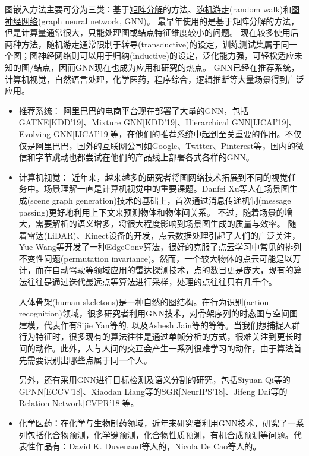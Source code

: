\documentclass[reportComp]{thesis}
\begin{document}
图嵌入方法主要可分为三类：基于\underline{矩阵分解}的方法、\underline{随机游走}(random walk)和\underline{图神经网络}(graph neural network, GNN)。
最早年使用的是基于矩阵分解的方法，但是计算量通常很大，只能处理图或结点特征维度较小的问题。
现在较多使用后两种方法，随机游走通常限制于转导(transductive)的设定，训练测试集属于同一个图；图神经网络则可以用于归纳(inductive)的设定，泛化能力强，可轻松适应未知的图/结点，因而GNN现在也成为应用和研究的热点。
GNN已经在推荐系统，计算机视觉，自然语言处理，化学医药，程序综合，逻辑推断等大量场景得到广泛应用。
\begin{itemize}
    \item 推荐系统：
    阿里巴巴的电商平台现在部署了大量的GNN\cite{zhu:aligraph_vldb_2019}，包括GATNE[KDD'19]、Mixture GNN[KDD'19]、Hierarchical GNN[IJCAI'19]、Evolving GNN[IJCAI'19]等，在他们的推荐系统中起到至关重要的作用。不仅仅是阿里巴巴，国外的互联网公司如Google、Twitter、Pinterest等，国内的微信和字节跳动也都尝试在他们的产品线上部署各式各样的GNN。
    
    \item 计算机视觉：
    近年来，越来越多的研究者将图网络技术拓展到不同的视觉任务中。场景理解一直是计算机视觉中的重要课题。Danfei Xu等人在场景图生成(scene graph generation)技术的基础上，首次通过消息传递机制(message passing)更好地利用上下文来预测物体和物体间关系\cite{Xu:sgg_cvpr_2017}。
    不过，随着场景的增大，需要解析的语义增多，将很大程度影响到场景图生成的质量与效率。
    随着雷达(LiDAR)、Kinect设备的开发，点云数据处理引起了人们的广泛关注，Yue Wang等开发了一种EdgeConv算法\cite{wang:dgcnn_tog_2018}，很好的克服了点云学习中常见的排列不变性问题(permutation invariance)。然而，一个较大物体的点云可能是以万计，而在自动驾驶等领域应用的雷达探测技术，点的数目更是庞大，现有的算法往往是通过迭代最远点等算法进行采样，处理的点往往只有几千个。
    
    人体骨架(human skeletons)是一种自然的图结构。在行为识别(action recognition)领域，很多研究者利用GNN技术，对骨架序列的时态图与空间图建模，代表作有Sijie Yan等的\cite{yan:action_aaai_2018}, 以及Ashesh Jain等的\cite{jain:action_cvpr_2016}等等。当我们想捕捉人群行为特征时，很多现有的算法往往是通过单帧分析的方式，很难关注到更长时间的动作。此外，人与人间的交互会产生一系列很难学习的动作，由于算法首先需要识别出哪些点属于同一个人。

    另外，还有采用GNN进行目标检测及语义分割的研究，包括Siyuan Qi等的GPNN[ECCV'18]、Xiaodan Liang等的SGR[NeurIPS'18]、Jifeng Dai等的Relation Network[CVPR'18]等。
    
    \item{化学医药}：在化学与生物制药领域，近年来研究者利用GNN技术，研究了一系列包括化合物预测，化学键预测，化合物性质预测，有机合成预测等问题。代表性作品有：David K. Duvenaud等人的\cite{david:conv_nips_2015}，Nicola De Cao等人的\cite{nicola:molgan_icml_2018}。
    
\end{itemize}
\end{document}
